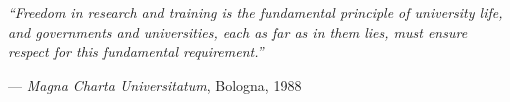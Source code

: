 \begin{titlepage}
\vfill

\begin{minipage}{0.85\textwidth}
\centering\small\itshape
``Freedom in research and training is the fundamental principle of university
life, and governments and universities, each as far as in them lies, must
ensure respect for this fundamental requirement.''

\upshape\smallskip
--- \textit{Magna Charta Universitatum}, Bologna, 1988~\cite{magna-charta}
\end{minipage}

\vspace{1cm}

\end{titlepage}

\tableofcontents



\clearpage
\printbibliography[heading=bibintoc,title={References}]

\printabstractappendix


